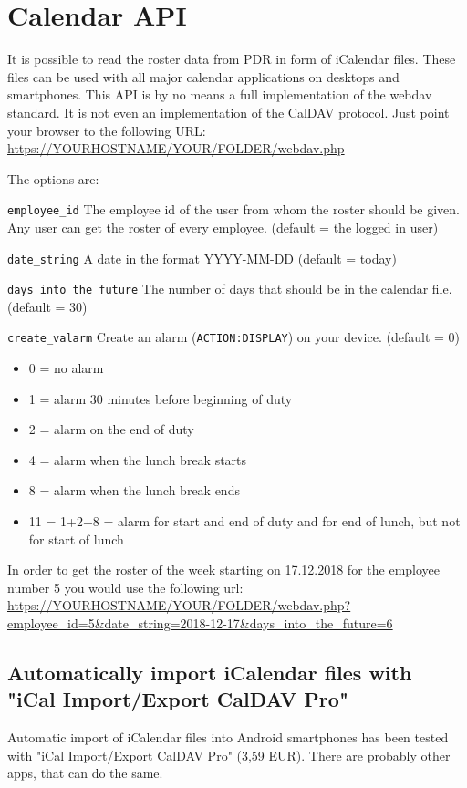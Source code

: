 \section{Calendar API}\label{section-calendar-api}
It is possible to read the roster data from PDR in form of iCalendar files.
These files can be used with all major calendar applications on desktops and smartphones.
This API is by no means a full implementation of the webdav standard. It is not even an implementation of the CalDAV protocol.
Just point your browser to the following URL:
\url{https://YOURHOSTNAME/YOUR/FOLDER/webdav.php}


The options are:
\begin{description}
	\item \lstinline|employee_id|
	The employee id of the user from whom the roster should be given.
	Any user can get the roster of every employee.
	(default = the logged in user)
	\item \lstinline|date_string|
	A date in the format YYYY-MM-DD
	(default = today)
	\item \lstinline|days_into_the_future|
	The number of days that should be in the calendar file.
	(default = 30)
	\item \lstinline|create_valarm|
	Create an alarm (\lstinline|ACTION:DISPLAY|) on your device.
	(default = 0)
	\begin{itemize}
        \item 0 = no alarm
        \item 1 = alarm 30 minutes before beginning of duty
        \item 2 = alarm on the end of duty
        \item 4 = alarm when the lunch break starts
        \item 8 = alarm when the lunch break ends
        \item 11 = 1+2+8 = alarm for start and end of duty and for end of lunch, but not for start of lunch
    \end{itemize}	
\end{description}	

In order to get the roster of the week starting on 17.12.2018 for the employee number 5 you would use the following url:
\url{https://YOURHOSTNAME/YOUR/FOLDER/webdav.php?employee_id=5&date_string=2018-12-17&days_into_the_future=6}

\subsection{Automatically import iCalendar files with "iCal Import/Export CalDAV Pro"}
Automatic import of iCalendar files into Android smartphones has been tested with 
"iCal Import/Export CalDAV Pro" (3,59 EUR). There are probably other apps, that can do the same.

